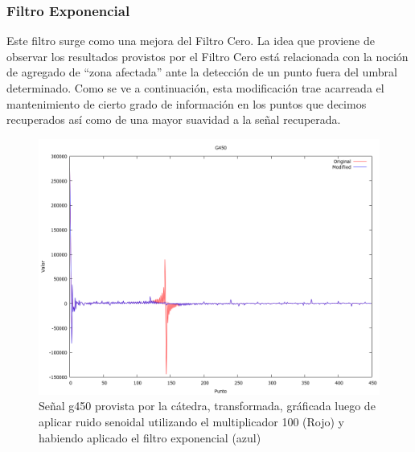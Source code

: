 \subsubsection{Filtro Exponencial}

Este filtro surge como una mejora del Filtro Cero. La idea que proviene de
observar los resultados provistos por el Filtro Cero est\'a relacionada con la
noci\'on de agregado de ``zona afectada'' ante la detecci\'on de un punto fuera
del umbral determinado. Como se ve a continuaci\'on, esta modificaci\'on trae
acarreada el mantenimiento de cierto grado de informaci\'on en los puntos que
decimos recuperados as\'i como de una mayor suavidad a la se\~nal recuperada.


\begin{figure}
\begin {center}
\includegraphics[width=360pt]{../matlab/g450-sin100-exp-spec.png}
\end {center}
\caption{Se\~nal g450 provista por la c\'atedra, transformada, gr\'aficada
luego de aplicar ruido senoidal utilizando el multiplicador 100 (Rojo) y 
habiendo aplicado el filtro exponencial (azul)}
\label{fig:SinProm}
\end{figure}

